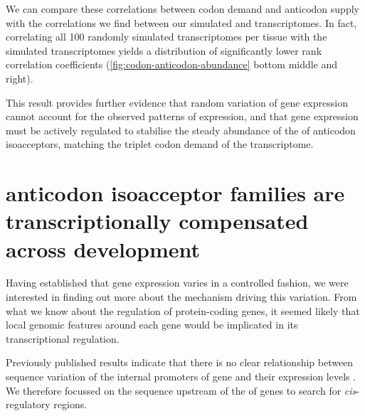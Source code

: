We can compare these correlations between \mrna codon demand and \trna anticodon
supply with the correlations we find between our simulated \mrna and \trna
transcriptomes. In fact, correlating all \num{100} randomly simulated \trna
transcriptomes per tissue with the simulated \mrna transcriptomes yields a
distribution of significantly lower rank correlation coefficients
(\cref{fig:codon-anticodon-abundance} bottom middle and right).

This result provides further evidence that random variation of \trna gene
expression cannot account for the observed patterns of expression, and that
\trna gene expression must be actively regulated to stabilise the steady
abundance of the of \trna anticodon isoacceptors, matching the triplet codon
demand of the \mrna transcriptome.

\section{\trna anticodon isoacceptor families are transcriptionally compensated
across development}

Having established that \trna gene expression varies in a controlled fashion, we
were interested in finding out more about the mechanism driving this variation.
From what we know about the regulation of protein-coding genes, it seemed likely
that local genomic features around each \trna gene would be implicated in its
transcriptional regulation.

Previously published results indicate that there is no clear relationship
between sequence variation of the internal promoters of \trna gene and their
expression levels \citep{Oler:2010,Canella:2012}. We therefore focussed on the
sequence upstream of the \tss of \trna genes to search for \emph{cis}-regulatory
regions.

